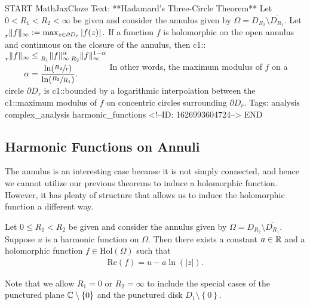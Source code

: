 \documentclass{memoir}
\begin{document}
\begin{anki}
START
MathJaxCloze
Text: **Hadamard's Three-Circle Theorem**
Let \(0<R_1<R_2<\infty\) be given and consider the annulus given by \(\Omega = D_{R_2} \setminus \overline{D_{R_1}}\). Let
\(\begin{align*}
  	\prescript{}{r}\|f\|_\infty := \textrm{max}_{z \in \partial D_r} \left| f(z) \right| .
  \end{align*}\)
If a function \(f\) is holomorphic on the open annulus and continuous on the closure of the annulus, then
{{c1::\(\begin{align*}
      	\prescript{}{r}\|f\|_{\infty} &\leq \prescript{}{R_1}\|f\|_{\infty}^{\alpha } \prescript{}{R_2}\|f\|_{\infty}^{1-\alpha }\\
      	\alpha &= \frac{\ln(\sfrac{R_2}{r})}{\ln(\sfrac{R_2}{R_1})}.
        \end{align*}\)}}
In other words, the maximum modulus of \(f\) on a circle \(\partial D_r\) is {{c1::bounded by a logarithmic interpolation}} between the {{c1::maximum modulus of \(f\) on concentric circles surrounding \(\partial D_r\)}}.
Tags: analysis complex_analysis harmonic_functions
<!--ID: 1626993604724-->
END
\end{anki}


\subsection{Harmonic Functions on Annuli}
\label{sub:harmonic_functions_on_annuli}

The annulus is an interesting case because it is not simply connected, and hence we cannot utilize our previous theorems to induce a holomorphic function. However, it has plenty of structure that allows us to induce the holomorphic function a different way.

\begin{thm}
	Let \(0\leq R_1<R_2\) be given and consider the annulus given by \(\Omega = D_{R_2}\setminus \overline{D_{R_1}}\). Suppose \(u\) is a harmonic function on \(\Omega \). Then there exists a constant \(a \in \mathbb{R}\) and a holomorphic function \(f \in \textrm{Hol}(\Omega )\) such that
	\begin{align*}
		\textrm{Re}(f) = u - a \ln(\left| z \right| ).
	\end{align*}
\end{thm}
Note that we allow \(R_1=0\) or \(R_2=\infty\) to include the special cases of the punctured plane \(\mathbb{C}\setminus\left\{ 0 \right\} \) and the punctured disk \(D_1\setminus\left\{ 0 \right\} \).
\end{document}

